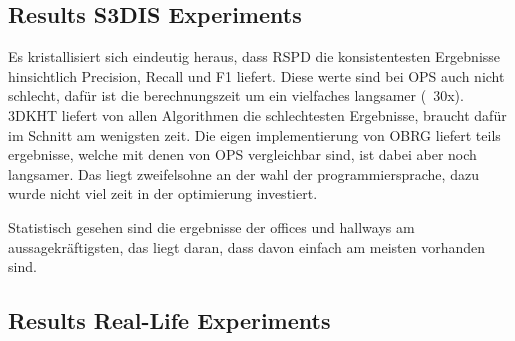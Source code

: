 \documentclass[main.tex]{subfiles}
\begin{document}





\subsection*{Results S3DIS Experiments}
Es kristallisiert sich eindeutig heraus, dass RSPD die konsistentesten Ergebnisse hinsichtlich
Precision, Recall und F1 liefert. Diese werte sind bei OPS auch nicht schlecht, dafür ist die
berechnungszeit um ein vielfaches langsamer (~30x). 3DKHT liefert von allen Algorithmen die schlechtesten
Ergebnisse, braucht dafür im Schnitt am wenigsten zeit. Die eigen implementierung von OBRG liefert teils ergebnisse,
welche mit denen von OPS vergleichbar sind, ist dabei aber noch langsamer. Das liegt zweifelsohne an der wahl der
programmiersprache, dazu wurde nicht viel zeit in der optimierung investiert.

Statistisch gesehen sind die ergebnisse der offices und hallways am aussagekräftigsten, das liegt daran, dass davon einfach am meisten vorhanden sind.



\subsection{Results Real-Life Experiments}
\end{document}

